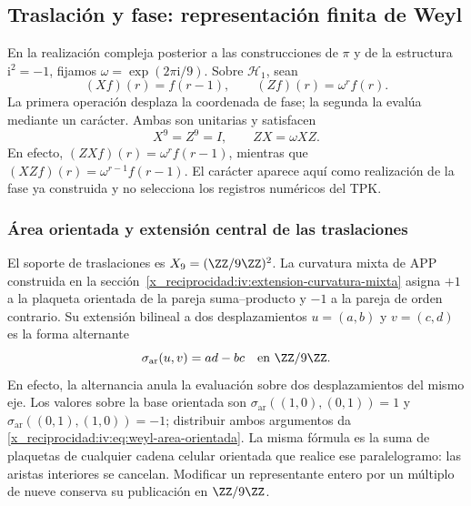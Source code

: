 \subsection{Traslación y fase: representación finita de Weyl}

En la realización compleja posterior a las construcciones de
\(\pi\) y de la estructura \(\mathrm i^2=-1\), fijamos
\(\omega=\exp(2\pi\mathrm i/9)\). Sobre \(\mathcal H_1\), sean
\begin{equation}
 (Xf)(r)=f(r-1),\qquad (Zf)(r)=\omega^r f(r).
 \label{x_reciprocidad:iv:eq:weyl-operadores}
\end{equation}
La primera operación desplaza la coordenada de fase; la segunda la
evalúa mediante un carácter. Ambas son unitarias y satisfacen
\begin{equation}
 X^9=Z^9=I,\qquad ZX=\omega XZ.
 \label{x_reciprocidad:iv:eq:weyl-relacion}
\end{equation}
En efecto, \((ZXf)(r)=\omega^r f(r-1)\), mientras que
\((XZf)(r)=\omega^{r-1}f(r-1)\). El carácter aparece aquí como
realización de la fase ya construida y no selecciona los registros
numéricos del TPK.

\subsubsection{Área orientada y extensión central de las traslaciones}
\label{x_reciprocidad:iv:weyl-area-extension}

El soporte de traslaciones es \(X_9=(\ZZ/9\ZZ)^2\).
La curvatura mixta de APP construida en la
sección~\ref{x_reciprocidad:iv:extension-curvatura-mixta} asigna \(+1\) a la
plaqueta orientada de la pareja suma--producto y \(-1\) a la
pareja de orden contrario. Su extensión bilineal a dos desplazamientos
\(u=(a,b)\) y \(v=(c,d)\) es la forma alternante
\begin{equation}
 \sigma_{\mathrm{ar}}(u,v)=ad-bc\quad\text{en }\ZZ/9\ZZ.
 \label{x_reciprocidad:iv:eq:weyl-area-orientada}
\end{equation}
En efecto, la alternancia anula la evaluación sobre dos desplazamientos
del mismo eje. Los valores sobre la base orientada son
\(\sigma_{\mathrm{ar}}((1,0),(0,1))=1\) y
\(\sigma_{\mathrm{ar}}((0,1),(1,0))=-1\); distribuir ambos
argumentos da \eqref{x_reciprocidad:iv:eq:weyl-area-orientada}. La misma fórmula es
la suma de plaquetas de cualquier cadena celular orientada que realice
ese paralelogramo: las aristas interiores se cancelan. Modificar un
representante entero por un múltiplo de nueve conserva su publicación
en \(\ZZ/9\ZZ\).


